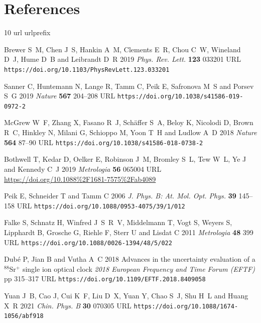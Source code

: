 \documentclass[10pt,a4paper]{iopart}
\begin{document}
\section*{References}

%

\providecommand{\newblock}{}
\begin{thebibliography}{10}
\expandafter\ifx\csname url\endcsname\relax
  \def\url#1{{\tt #1}}\fi
\expandafter\ifx\csname urlprefix\endcsname\relax\def\urlprefix{URL }\fi
\providecommand{\eprint}[2][]{\url{#2}}

Brewer S~M, Chen J~S, Hankin A~M, Clements E~R, Chou C~W, Wineland D~J, Hume
  D~B and Leibrandt D~R 2019 {\em Phys. Rev. Lett.\/} {\bf 123} 033201
  \urlprefix\url{https://doi.org/10.1103/PhysRevLett.123.033201}

Sanner C, Huntemann N, Lange R, Tamm C, Peik E, Safronova M~S and Porsev S~G
  2019 {\em Nature\/} {\bf 567} 204--208
  \urlprefix\url{https://doi.org/10.1038/s41586-019-0972-2}

McGrew W~F, Zhang X, Fasano R~J, Sch\"affer S~A, Beloy K, Nicolodi D, Brown
  R~C, Hinkley N, Milani G, Schioppo M, Yoon T~H and Ludlow A~D 2018 {\em
  Nature\/} {\bf 564} 87--90
  \urlprefix\url{https://doi.org/10.1038/s41586-018-0738-2}

Bothwell T, Kedar D, Oelker E, Robinson J~M, Bromley S~L, Tew W~L, Ye J and
  Kennedy C~J 2019 {\em Metrologia\/} {\bf 56} 065004
  \urlprefix\url{https://doi.org/10.1088%2F1681-7575%2Fab4089}

Peik E, Schneider T and Tamm C 2006 {\em J. Phys. B: At. Mol. Opt. Phys.\/}
  {\bf 39} 145--158 \urlprefix\url{https://doi.org/10.1088/0953-4075/39/1/012}

Falke S, Schnatz H, Winfred J~S~R~V, Middelmann T, Vogt S, Weyers S, Lipphardt
  B, Grosche G, Riehle F, Sterr U and Lisdat C 2011 {\em Metrologia\/} {\bf 48}
  399 \urlprefix\url{https://doi.org/10.1088/0026-1394/48/5/022}

Dub\'e P, Jian B and Vutha A~C 2018 Advances in the uncertainty evaluation of a
  $^{88}${Sr}$^+$ single ion optical clock {\em 2018 European Frequency and
  Time Forum (EFTF)\/} pp 315--317
  \urlprefix\url{https://doi.org/10.1109/EFTF.2018.8409058}

Yuan J~B, Cao J, Cui K~F, Liu D~X, Yuan Y, Chao S~J, Shu H~L and Huang X~R 2021
  {\em Chin. Phys. B\/} {\bf 30} 070305
  \urlprefix\url{https://doi.org/10.1088/1674-1056/abf918}


\end{thebibliography}
\end{document}
